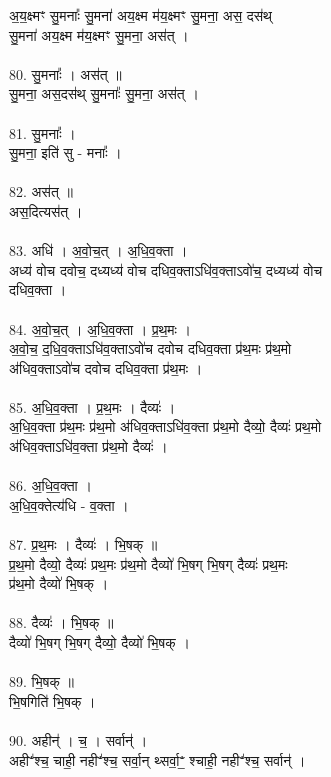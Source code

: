 अ॒य॒क्ष्मꣳ सु॒मनाः᳚ सु॒मना॑ अय॒क्ष्म म॑य॒क्ष्मꣳ सु॒मना॒ अस॒ दस॑थ्\\
सु॒मना॑ अय॒क्ष्म म॑य॒क्ष्मꣳ सु॒मना॒ अस॑त् ।\\
\\
80. सु॒मनाः᳚ । अस॑त् ॥\\
सु॒मना॒ अस॒दस॑थ् सु॒मनाः᳚ सु॒मना॒ अस॑त् ।\\
\\
81. सु॒मनाः᳚ ।\\
सु॒मना॒ इति॑ सु - मनाः᳚ ।\\
\\
82. अस॑त् ॥\\
अस॒दित्यस॑त् ।\\
\\
83. अधि॑ । अ॒वो॒च॒त् । अ॒धि॒व॒क्ता ।\\
अध्य॑ वोच दवोच॒ दध्यध्य॑ वोच दधिव॒क्ताऽधि॑व॒क्ताऽवो॑च॒ दध्यध्य॑ वोच\\
दधिव॒क्ता ।\\
\\
84. अ॒वो॒च॒त् । अ॒धि॒व॒क्ता । प्र॒थ॒मः ।\\
अ॒वो॒च॒ द॒धि॒व॒क्ताऽधि॑व॒क्ताऽवो॑च दवोच दधिव॒क्ता प्र॑थ॒मः प्र॑थ॒मो\\
अ॑धिव॒क्ताऽवो॑च दवोच दधिव॒क्ता प्र॑थ॒मः ।\\
\\
85. अ॒धि॒व॒क्ता । प्र॒थ॒मः । दैव्यः॑ ।\\
अ॒धि॒व॒क्ता प्र॑थ॒मः प्र॑थ॒मो अ॑धिव॒क्ताऽधि॑व॒क्ता प्र॑थ॒मो दैव्यो॒ दैव्यः॑ प्रथ॒मो\\
अ॑धिव॒क्ताऽधि॑व॒क्ता प्र॑थ॒मो दैव्यः॑ ।\\
\\
86. अ॒धि॒व॒क्ता ।\\
अ॒धि॒व॒क्तेत्य॑धि - व॒क्ता ।\\
\\
87. प्र॒थ॒मः । दैव्यः॑ । भि॒षक् ॥\\
प्र॒थ॒मो दैव्यो॒ दैव्यः॑ प्रथ॒मः प्र॑थ॒मो दैव्यो॑ भि॒षग् भि॒षग् दैव्यः॑ प्रथ॒मः\\
प्र॑थ॒मो दैव्यो॑ भि॒षक् ।\\
\\
88. दैव्यः॑ । भि॒षक् ॥\\
दैव्यो॑ भि॒षग् भि॒षग् दैव्यो॒ दैव्यो॑ भि॒षक् ।\\
\\
89. भि॒षक् ॥\\
भि॒षगिति॑ भि॒षक् ।\\
\\
90. अहीन्॑ । च॒ । सर्वान्॑ ।\\
अहीꣲ॑श्च॒ चाही॒ नहीꣲ॑श्च॒ सर्वा॒न् थ्सर्वा॒ꣲ॒ श्चाही॒ नहीꣲ॑श्च॒ सर्वान्॑ ।\\
